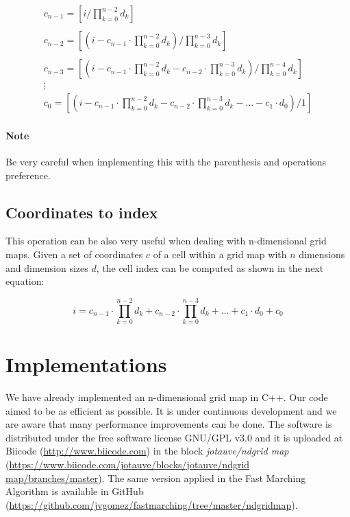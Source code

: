 \documentclass[12pt]{article}
\begin{document}
\begin{equation}
  \begin{array}{lcc}
    c_{n-1} = \left[i / \prod_{k=0}^{n-2}d_k \right] \\ \\
    c_{n-2} = \left[(i - c_{n-1} \cdot \prod_{k=0}^{n-2}d_k ) / \prod_{k=0}^{n-3}d_k \right] \\ \\
    c_{n-3} = \left[(i - c_{n-1} \cdot \prod_{k=0}^{n-2}d_k - c_{n-2} \cdot \prod_{k=0}^{n-3}d_k ) / \prod_{k=0}^{n-4}d_k \right] \\
    \vdots \\
    c_0 = \left[(i - c_{n-1} \cdot \prod_{k=0}^{n-2}d_k - c_{n-2} \cdot \prod_{k=0}^{n-3}d_k - \dots - c_1\cdot d_0 ) / 1  \right]
  \end{array}
  \label{eq:idx2coord}
\end{equation}

\paragraph{Note}
Be very careful when implementing this with the parenthesis and operations preference.

\subsection{Coordinates to index}
This operation can be also very useful when dealing with n-dimensional grid maps. Given a set of coordinates $c$ of a cell within a grid map with $n$ dimensions and dimension sizes $d$, the cell index can be computed as shown in the next equation:

\begin{equation}
  i = c_{n-1}\cdot\prod_{k=0}^{n-2}d_k + c_{n-2}\cdot\prod_{k=0}^{n-3}d_k + \dots + c_1\cdot d_0 + c_0
  \label{eq:coord2idx}
\end{equation}

\section{Implementations}
We have already implemented an n-dimensional grid map in C++. Our code aimed to be as efficient as possible. It is under continuous development and we are aware that many performance improvements can be done. The software is distributed under the free software license
GNU/GPL v3.0 and it is uploaded at Biicode (\url{http://www.biicode.com}) in the block \emph{jotauve/ndgrid map} (\url{https://www.biicode.com/jotauve/blocks/jotauve/ndgrid map/branches/master}). The same
version applied in the Fast Marching Algorithm is available in GitHub (\url{https://github.com/jvgomez/fastmarching/tree/master/ndgridmap}).
\end{document}
